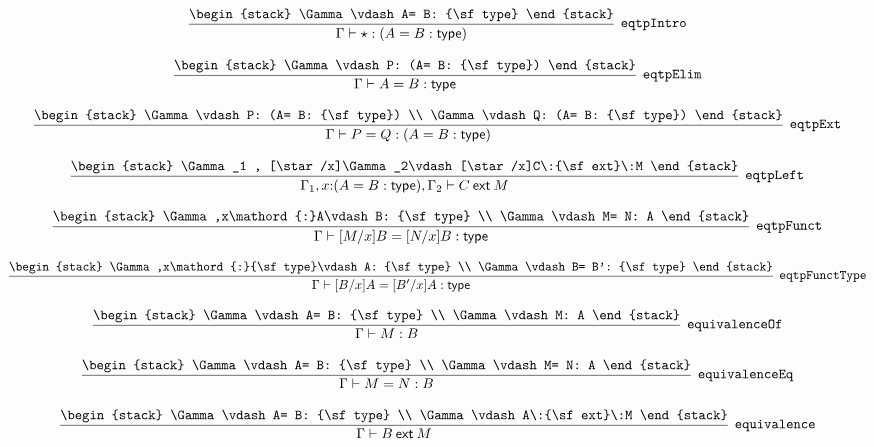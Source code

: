 \[
\infer[{\tt eqtpIntro}]{\Gamma \vdash \star : (A= B: {\sf type})}{
\begin{stack}
\Gamma \vdash A= B: {\sf type}
\end{stack}}
\]

\[
\infer[{\tt eqtpElim}]{\Gamma \vdash A= B: {\sf type}}{
\begin{stack}
\Gamma \vdash P: (A= B: {\sf type})
\end{stack}}
\]

\[
\infer[{\tt eqtpExt}]{\Gamma \vdash P= Q: (A= B: {\sf type})}{
\begin{stack}
\Gamma \vdash P: (A= B: {\sf type})
\\
\Gamma \vdash Q: (A= B: {\sf type})
\end{stack}}
\]

\[
\infer[{\tt eqtpLeft}]{\Gamma_1 ,x\mathord{:}(A= B: {\sf type}), \Gamma_2 \vdash C\:{\sf ext}\:M}{
\begin{stack}
\Gamma_1 , [\star /x]\Gamma_2\vdash [\star /x]C\:{\sf ext}\:M
\end{stack}}
\]

\[
\infer[{\tt eqtpFunct}]{\Gamma \vdash [M/x]B= [N/x]B: {\sf type}}{
\begin{stack}
\Gamma ,x\mathord{:}A\vdash B: {\sf type}
\\
\Gamma \vdash M= N: A
\end{stack}}
\]

\[
\infer[{\tt eqtpFunctType}]{\Gamma \vdash [B/x]A= [B'/x]A: {\sf type}}{
\begin{stack}
\Gamma ,x\mathord{:}{\sf type}\vdash A: {\sf type}
\\
\Gamma \vdash B= B': {\sf type}
\end{stack}}
\]

\[
\infer[{\tt equivalenceOf}]{\Gamma \vdash M: B}{
\begin{stack}
\Gamma \vdash A= B: {\sf type}
\\
\Gamma \vdash M: A
\end{stack}}
\]

\[
\infer[{\tt equivalenceEq}]{\Gamma \vdash M= N: B}{
\begin{stack}
\Gamma \vdash A= B: {\sf type}
\\
\Gamma \vdash M= N: A
\end{stack}}
\]

\[
\infer[{\tt equivalence}]{\Gamma \vdash B\:{\sf ext}\:M}{
\begin{stack}
\Gamma \vdash A= B: {\sf type}
\\
\Gamma \vdash A\:{\sf ext}\:M
\end{stack}}
\]

